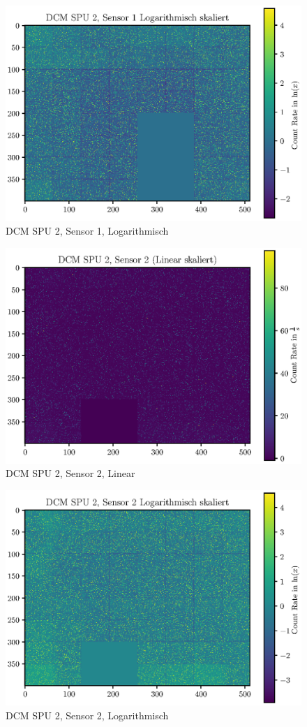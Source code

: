 \documentclass[12pt,twoside,a4paper]{scrartcl}
\begin{document}
		\begin{figure}[H]
			\includegraphics[width = \textwidth]{Plots/DCM/DCM_SPU2_Sensor1_log.eps}
			\caption{DCM SPU 2, Sensor 1, Logarithmisch}
		\end{figure}

		\begin{figure}[H]
			\includegraphics[width = \textwidth]{Plots/DCM/DCM_SPU2_Sensor2_lin.eps}
			\caption{DCM SPU 2, Sensor 2, Linear}
		\end{figure}

		\begin{figure}[H]
			\includegraphics[width = \textwidth]{Plots/DCM/DCM_SPU2_Sensor2_log.eps}
			\caption{DCM SPU 2, Sensor 2, Logarithmisch}
		\end{figure}
\end{document}
